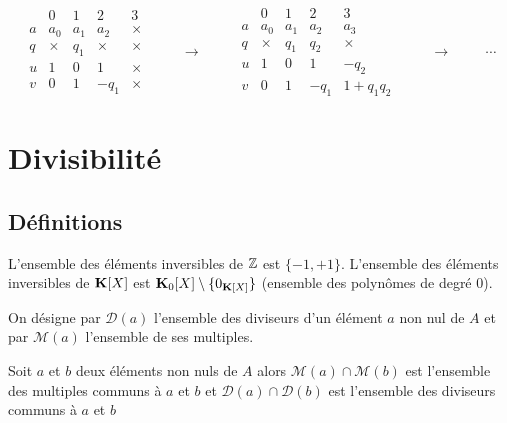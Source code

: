 \begin{displaymath}
\begin{array}{l|l|l|l|l}
 & 0 & 1 & 2 & 3 \\ \hline
a & a_0 & a_1 & a_2 & × \\ 
q & ×   & q_1 & ×   & × \\ 
u & 1   & 0   & 1 & × \\
v & 0   & 1   & -q_1 & ×
\end{array}
\hspace{1cm}\rightarrow\hspace{1cm}
\begin{array}{l|l|l|l|l}
 & 0 & 1 & 2 & 3 \\ \hline
a & a_0 & a_1 & a_2 & a_3 \\ 
q & ×   & q_1 & q_2   & × \\ 
u & 1   & 0   & 1 & -q_2 \\
v & 0   & 1   & -q_1 & 1+q_1q_2
\end{array}
\hspace{1cm}\rightarrow \hspace{1cm}\cdots
\end{displaymath}

\section{Divisibilité}
\subsection{Définitions}
\begin{prop}[Inversibles]
 L'ensemble des éléments inversibles de $\mathbb{Z}$ est $\{-1,+1\}$. L'ensemble des éléments inversibles de $\mathbf{K}[X]$ est $\mathbf{K}_0[X]\setminus\{0_{\mathbf{K}[X]}\}$ (ensemble des polynômes de degré $0$).
\end{prop}
 \begin{nota}
  On désigne par $\mathcal D (a)$ l'ensemble des diviseurs d'un élément $a$ non nul de $A$ et par $\mathcal M (a)$ l'ensemble de ses multiples. 
 \end{nota}
\begin{rem}
 Soit $a$ et $b$ deux éléments non nuls de $A$ alors $\mathcal M (a)\cap \mathcal M (b)$ est l'ensemble des multiples communs à $a$ et $b$ et $\mathcal D (a)\cap \mathcal D (b)$ est l'ensemble des diviseurs communs à $a$ et $b$  
\end{rem}


